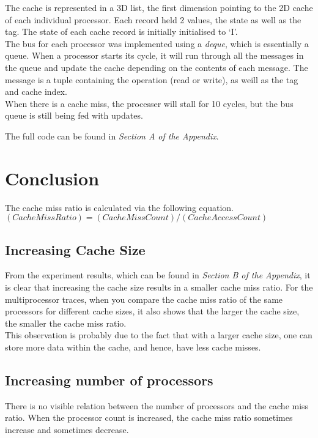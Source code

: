 \documentclass[]{article}
\begin{document}
The cache is represented in a 3D list, the first dimension pointing to the 2D cache of each individual processor. Each record held 2 values, the state as well as the tag. The state of each cache record is initially initialised to `I'. \\

The bus for each processor was implemented using a \emph{deque}, which is essentially a queue. When a processor starts its cycle, it will run through all the messages in the queue and update the cache depending on the contents of each message. The message is a tuple containing the operation (read or write), as weill as the tag and cache index. \\

When there is a cache miss, the processer will stall for 10 cycles, but the bus queue is still being fed with updates.

The full code can be found in \emph{Section A of the Appendix}.

\section{Conclusion}
The cache miss ratio is calculated via the following equation. \\

$(Cache Miss Ratio) = (Cache Miss Count)/(Cache Access Count)$

\subsection{Increasing Cache Size}
From the experiment results, which can be found in \emph{Section B of the Appendix}, it is clear that increasing the cache size results in a smaller cache miss ratio. For the multiprocessor traces, when you compare the cache miss ratio of the same processors for different cache sizes, it also shows that the larger the cache size, the smaller the cache miss ratio.\\

This observation is probably due to the fact that with a larger cache size, one can store more data within the cache, and hence, have less cache misses.\\

\subsection{Increasing number of processors}
There is no visible relation between the number of processors and the cache miss ratio. When the processor count is increased, the cache miss ratio sometimes increase and sometimes decrease.\\
\end{document}
